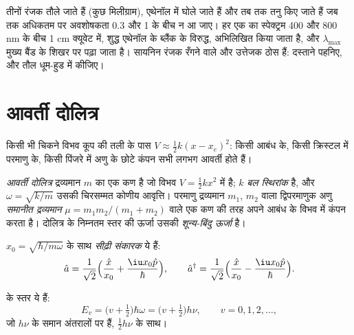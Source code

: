 \begin{inthelab}[रंजकों की एक श्रेणी का मापन]
तीनों रंजक तौले जाते हैं (कुछ मिलीग्राम), एथेनॉल में घोले जाते हैं और
तब तक तनु किए जाते हैं जब तक अधिकतम पर अवशोषकता 0.3 और 1 के बीच न आ जाए।
हर एक का स्पेक्ट्रम 400 और 800 nm के बीच 1 cm क्यूवेट में, शुद्ध एथेनॉल के
ब्लैंक के विरुद्ध, अभिलिखित किया जाता है, और $\lambda_{\max}$ मुख्य बैंड के
शिखर पर पढ़ा जाता है। सायनिन रंजक रँगने वाले और उत्तेजक ठोस हैं: दस्ताने पहनिए,
और तौल धूम-हुड में कीजिए।
\end{inthelab}

\section{आवर्ती दोलित्र}

किसी भी चिकने विभव कूप की तली के पास $V \approx \frac12 k(x - x_e)^2$:
किसी आबंध के, किसी क्रिस्टल में परमाणु के, किसी पिंजरे में अणु के छोटे कंपन
सभी लगभग आवर्ती होते हैं।

\begin{definition}[आवर्ती दोलित्र, बल स्थिरांक, समानीत द्रव्यमान, शून्य-बिंदु ऊर्जा]\label{def:b3:quantum-model-systems:oscillator}
\emph{आवर्ती दोलित्र} द्रव्यमान
$m$ का एक कण है जो विभव $V = \frac12 kx^2$ में है; $k$ \emph{बल
स्थिरांक} है, और $\omega = \sqrt{k/m}$ उसकी चिरसम्मत
कोणीय आवृत्ति। परमाणु द्रव्यमान $m_1$, $m_2$ वाला द्विपरमाणुक अणु
\emph{समानीत द्रव्यमान}
$\mu = m_1m_2/(m_1 + m_2)$ वाले एक कण की तरह अपने आबंध के विभव में कंपन करता है।
दोलित्र के निम्नतम स्तर की ऊर्जा उसकी \emph{शून्य-बिंदु ऊर्जा} है।
\end{definition}

\begin{definition}[सीढ़ी संकारक]\label{def:b3:quantum-model-systems:ladder}
$x_0 = \sqrt{\hbar/m\omega}$ के साथ \emph{सीढ़ी संकारक}
ये हैं:
\[
\hat a = \frac{1}{\sqrt2}\Big(\frac{\hat x}{x_0} + \frac{\iu x_0\hat p}{\hbar}\Big),
\qquad \hat a^\dagger = \frac{1}{\sqrt2}\Big(\frac{\hat x}{x_0} -
\frac{\iu x_0\hat p}{\hbar}\Big).
\]
\end{definition}

\begin{theorem}[आवर्ती दोलित्र के स्तर]\label{thm:b3:quantum-model-systems:oscillator}
 के स्तर ये हैं:
\[
E_v = \big(v + \tfrac12\big)\hbar\omega = \big(v + \tfrac12\big)h\nu, \qquad v =
0, 1, 2, \dots,
\]
जो $h\nu$ के समान अंतरालों पर हैं,  $\frac12h\nu$ के साथ।
\end{theorem}

